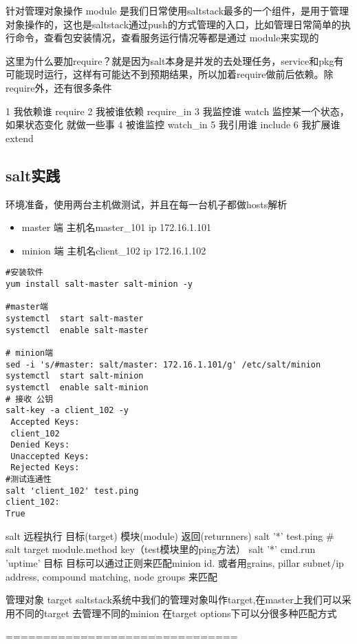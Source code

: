 {{{{{针对管理对象操作
module 是我们日常使用saltstack最多的一个组件，是用于管理对象操作的，这也是saltstack通过push的方式管理的入口，比如管理日常简单的执行命令，查看包安装情况，查看服务运行情况等都是通过 module来实现的 


这里为什么要加require？就是因为salt本身是并发的去处理任务，service和pkg有可能现时运行，这样有可能达不到预期结果，所以加着require做前后依赖。除require外，还有很多条件

1 我依赖谁 require
2 我被谁依赖 require_in
3 我监控谁 watch 监控某一个状态，如果状态变化 就做一些事
4 被谁监控 watch_in
5 我引用谁 include
6 我扩展谁  extend

\subsection{salt实践}

环境准备，使用两台主机做测试，并且在每一台机子都做hosts解析 

\begin{itemize}
\item master 端 主机名master_101 ip 172.16.1.101
\item minion 端 主机名client_102 ip 172.16.1.102
\end{itemize}

\begin{lstlisting}
#安装软件
yum install salt-master salt-minion -y

#master端
systemctl  start salt-master
systemctl  enable salt-master 

# minion端
sed -i 's/#master: salt/master: 172.16.1.101/g' /etc/salt/minion
systemctl  start salt-minion 
systemctl  enable salt-minion 
# 接收 公钥
salt-key -a client_102 -y
 Accepted Keys:
 client_102
 Denied Keys:
 Unaccepted Keys:
 Rejected Keys:
#测试连通性
salt 'client_102' test.ping
client_102:
True
\end{lstlisting}

salt 远程执行
目标(target)
模块(module)
返回(returnners)
salt '*' test.ping # salt target module.method key（test模块里的ping方法）
salt '*' cmd.run 'uptime'
目标
目标可以通过正则来匹配minion id. 或者用grains, pillar subnet/ip address, compound matching, node groups 来匹配


管理对象 target
saltstack系统中我们的管理对象叫作target,在master上我们可以采用不同的target 去管理不同的minion
在target options下可以分很多种匹配方式




===============================




}}}}}

